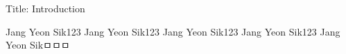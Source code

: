 Title: Introduction


Jang Yeon Sik123
Jang Yeon Sik123
Jang Yeon Sik123
Jang Yeon Sik123
Jang Yeon Sikㅁㅁㅁ